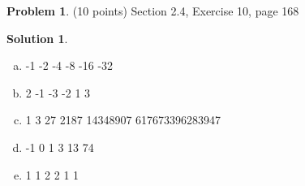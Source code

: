 \documentclass{article}
\theoremstyle{definition}
\newtheorem{problem}{Problem}
\newtheorem*{solution}{Solution}
\begin{document}
\begin{problem} (10 points)
Section 2.4, Exercise 10, page 168
\end{problem}
\begin{solution}
\begin{enumerate}[a)]\ \\
  \item 
                               -1
                               -2
                               -4
                               -8
                              -16
                              -32

  \item
                                2
                               -1
                               -3
                               -2
                               1
                               3

  
  \item
                               1
                               3
                               27
                              2187
                            14348907
                        617673396283947

  
  \item
                              -1
                               0
                               1
                               3
                               13
                               74

  
  \item
                               1
                               1
                               2
                               2
                               1
                               1

  

\end{enumerate}
\end{solution}
\end{document}
